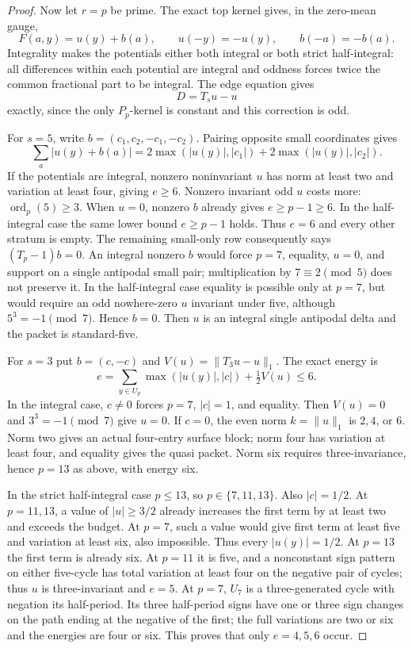 \documentclass[11pt]{amsart}
\numberwithin{theorem}{section}
\theoremstyle{remark}
\numberwithin{equation}{section}
\begin{document}
\begin{proof}
Now let \(r=p\) be prime. The exact top kernel gives, in the zero-mean
gauge,
\[
F(a,y)=u(y)+b(a),\qquad u(-y)=-u(y),\qquad b(-a)=-b(a).
\tag{14}\label{eq:14}
\]
Integrality makes the potentials either both integral or both strict
half-integral: all differences within each potential are integral and
oddness forces twice the common fractional part to be integral. The edge
equation gives
\[
D=T_su-u
\]
exactly, since the only \(P_p\)-kernel is constant and this correction
is odd.

For \(s=5\), write \(b=(c_1,c_2,-c_1,-c_2)\). Pairing opposite small
coordinates gives
\[
\sum_a|u(y)+b(a)|=2\max(|u(y)|,|c_1|)+2\max(|u(y)|,|c_2|).
\]
If the potentials are integral, nonzero noninvariant \(u\) has norm at
least two and variation at least four, giving \(e\ge6\). Nonzero
invariant odd \(u\) costs more: \(\operatorname{ord}_p(5)\ge3\).
When \(u=0\), nonzero \(b\) already gives \(e\ge p-1\ge6\). In
the half-integral case the same lower bound \(e\ge p-1\) holds. Thus
\(e=6\) and every other stratum is empty. The remaining small-only row
consequently says \((T_p-1)b=0\). An integral nonzero \(b\) would
force \(p=7\), equality, \(u=0\), and support on a single antipodal
small pair; multiplication by \(7\equiv2\pmod5\) does not preserve it.
In the half-integral case equality is possible only at \(p=7\), but
would require an odd nowhere-zero \(u\) invariant under five, although
\(5^3=-1\pmod7\). Hence \(b=0\). Then \(u\) is an integral single
antipodal delta and the packet is standard-five.

For \(s=3\) put \(b=(c,-c)\) and \(V(u)=\|T_3u-u\|_1\). The
exact energy is
\[
e=\sum_{y\in U_p}\max(|u(y)|,|c|)+\tfrac12V(u)\le6.
\tag{15}\label{eq:15}
\]
In the integral case, \(c\ne0\) forces \(p=7\), \(|c|=1\), and
equality. Then \(V(u)=0\) and \(3^3=-1\pmod7\) give \(u=0\).
If \(c=0\), the even norm \(k=\|u\|_1\) is \(2,4\), or \(6\).
Norm two gives an actual four-entry surface block; norm four has variation
at least four, and equality gives the quasi packet. Norm six requires
three-invariance, hence \(p=13\) as above, with energy six.

In the strict half-integral case \(p\le13\), so
\(p\in\{7,11,13\}\). Also \(|c|=1/2\). At \(p=11,13\), a value
of \(|u|\ge3/2\) already increases the first term by at least two and
exceeds the budget. At \(p=7\), such a value would give first term at
least five and variation at least six, also impossible. Thus every
\(|u(y)|=1/2\). At \(p=13\) the first term is already six. At
\(p=11\) it is five, and a nonconstant sign pattern on either five-cycle
has total variation at least four on the negative pair of cycles; thus
\(u\) is three-invariant and \(e=5\). At \(p=7\), \(U_7\) is a
three-generated cycle with negation its half-period. Its three
half-period signs have one or three sign changes on the path ending at
the negative of the first; the full variations are two or six and the
energies are four or six. This proves that only \(e=4,5,6\) occur.


\end{proof}
\end{document}
